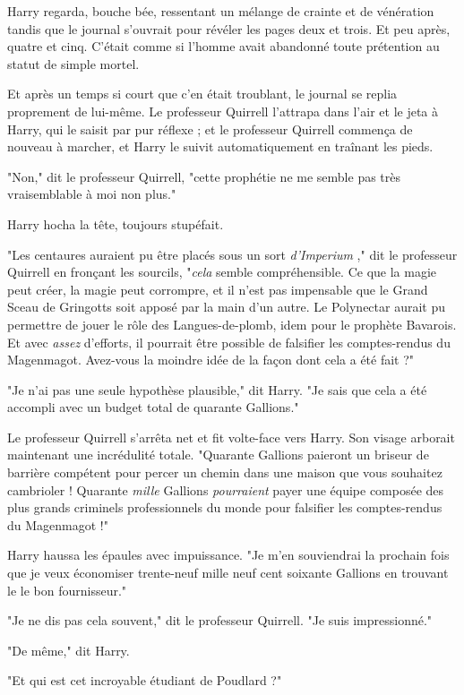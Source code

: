Harry regarda, bouche bée, ressentant un mélange de crainte et de vénération tandis que le journal s'ouvrait pour révéler les pages deux et trois. Et peu après, quatre et cinq. C'était comme si l'homme avait abandonné toute prétention au statut de simple mortel.

Et après un temps si court que c'en était troublant, le journal se replia proprement de lui-même. Le professeur Quirrell l'attrapa dans l'air et le jeta à Harry, qui le saisit par pur réflexe ; et le professeur Quirrell commença de nouveau à marcher, et Harry le suivit automatiquement en traînant les pieds.

"Non," dit le professeur Quirrell, "cette prophétie ne me semble pas très vraisemblable à moi non plus."

Harry hocha la tête, toujours stupéfait.

"Les centaures auraient pu être placés sous un sort \emph{d'Imperium} ," dit le professeur Quirrell en fronçant les sourcils, "\emph{cela}  semble compréhensible. Ce que la magie peut créer, la magie peut corrompre, et il n'est pas impensable que le Grand Sceau de Gringotts soit apposé par la main d'un autre. Le Polynectar aurait pu permettre de jouer le rôle des Langues-de-plomb, idem pour le prophète Bavarois. Et avec \emph{assez}  d'efforts, il pourrait être possible de falsifier les comptes-rendus du Magenmagot. Avez-vous la moindre idée de la façon dont cela a été fait ?"

"Je n'ai pas une seule hypothèse plausible," dit Harry. "Je sais que cela a été accompli avec un budget total de quarante Gallions."

Le professeur Quirrell s'arrêta net et fit volte-face vers Harry. Son visage arborait maintenant une incrédulité totale. "Quarante Gallions paieront un briseur de barrière compétent pour percer un chemin dans une maison que vous souhaitez cambrioler ! Quarante \emph{mille}  Gallions \emph{pourraient}  payer une équipe composée des plus grands criminels professionnels du monde pour falsifier les comptes-rendus du Magenmagot !"

Harry haussa les épaules avec impuissance. "Je m'en souviendrai la prochain fois que je veux économiser trente-neuf mille neuf cent soixante Gallions en trouvant le le bon fournisseur."

"Je ne dis pas cela souvent," dit le professeur Quirrell. "Je suis impressionné."

"De même," dit Harry.

"Et qui est cet incroyable étudiant de Poudlard ?"

